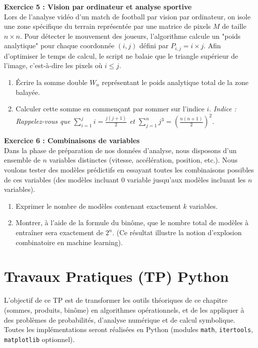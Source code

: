 \textbf{Exercice 5 : Vision par ordinateur et analyse sportive} \\
Lors de l'analyse vidéo d'un match de football par vision par ordinateur, on isole une zone spécifique du terrain représentée par une matrice de pixels $M$ de taille $n \times n$. Pour détecter le mouvement des joueurs, l'algorithme calcule un "poids analytique" pour chaque coordonnée $(i,j)$ défini par $P_{i,j} = i \times j$. 
Afin d'optimiser le temps de calcul, le script ne balaie que le triangle supérieur de l'image, c'est-à-dire les pixels où $i \le j$.
\begin{enumerate}
    \item Écrire la somme double $W_n$ représentant le poids analytique total de la zone balayée.
    \item Calculer cette somme en commençant par sommer sur l'indice $i$. 
    \textit{Indice : Rappelez-vous que $\sum_{i=1}^{j} i = \frac{j(j+1)}{2}$ et $\sum_{j=1}^{n} j^3 = \left(\frac{n(n+1)}{2}\right)^2$.}
\end{enumerate}

\textbf{Exercice 6 : Combinaisons de variables} \\
Dans la phase de préparation de nos données d'analyse, nous disposons d'un ensemble de $n$ variables distinctes (vitesse, accélération, position, etc.). Nous voulons tester des modèles prédictifs en essayant toutes les combinaisons possibles de ces variables (des modèles incluant $0$ variable jusqu'aux modèles incluant les $n$ variables).
\begin{enumerate}
    \item Exprimer le nombre de modèles contenant exactement $k$ variables.
    \item Montrer, à l'aide de la formule du binôme, que le nombre total de modèles à entraîner sera exactement de $2^n$. (Ce résultat illustre la notion d'explosion combinatoire en machine learning).
\end{enumerate}

\section*{Travaux Pratiques (TP) Python}

\vspace{0.3cm}
\noindent L'objectif de ce TP est de transformer les outils théoriques de ce chapitre (sommes, produits, binôme) en algorithmes opérationnels, et de les appliquer à des problèmes de probabilités, d'analyse numérique et de calcul symbolique. Toutes les implémentations seront réalisées en Python (modules \texttt{math}, \texttt{itertools}, \texttt{matplotlib} optionnel).

